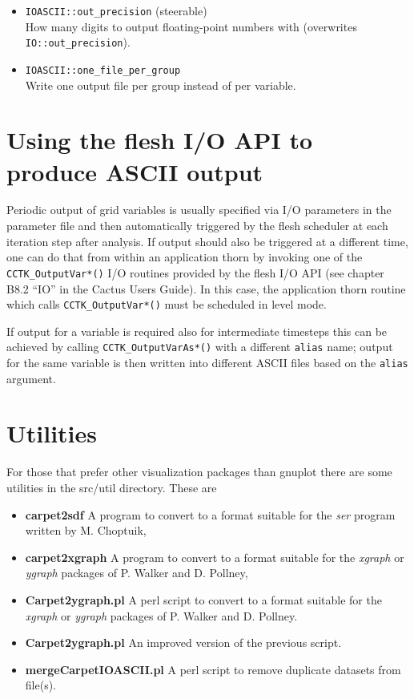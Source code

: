 \documentclass{article}
\begin{document}
\begin{itemize}
  \item {\tt IOASCII::out\_precision} (steerable)\\
        How many digits to output floating-point numbers with (overwrites
        {\tt IO::out\_precision}).

  \item {\tt IOASCII::one\_file\_per\_group}\\
        Write one output file per group instead of per variable.

\end{itemize}


\section{Using the flesh I/O API to produce ASCII output}

Periodic output of grid variables is usually specified via I/O parameters
in the parameter file and then automatically triggered by the flesh scheduler
at each iteration step after analysis. If output should also be triggered
at a different time, one can do that from within an application thorn by
invoking one of the {\tt CCTK\_OutputVar*()} I/O routines provided
by the flesh I/O API (see chapter B8.2 ``IO'' in the Cactus Users Guide).
In this case, the application thorn routine which calls {\tt CCTK\_OutputVar*()}
must be scheduled in level mode.

If output for a variable is required also for intermediate timesteps
this can be achieved by calling {\tt CCTK\_OutputVarAs*()} with a different
{\tt alias} name; output for the same variable is then written into
different ASCII files based on the {\tt alias} argument.


\section{Utilities}
\label{sec:utils}

For those that prefer other visualization packages than gnuplot there
are some utilities in the src/util directory. These are
\begin{itemize}
\item {\bf carpet2sdf} A program to convert to a format suitable for
  the {\it ser} program written by M. Choptuik,
\item {\bf carpet2xgraph} A program to convert to a format suitable
  for the {\it xgraph} or {\it ygraph} packages of P. Walker and D.
  Pollney,
\item {\bf Carpet2ygraph.pl} A perl script to convert to a format
  suitable for the {\it xgraph} or {\it ygraph} packages of P. Walker
  and D. Pollney.
\item {\bf Carpet2ygraph.pl} An improved version of the previous script.
\item {\bf mergeCarpetIOASCII.pl} A perl script to remove duplicate datasets from file(s).
\end{itemize}
\end{document}
